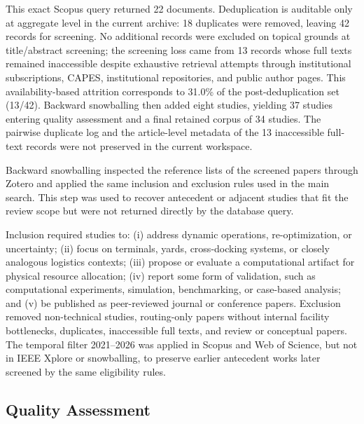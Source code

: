 \documentclass[preprint,12pt,number,longtitle]{elsarticle}
\begin{document}
This exact Scopus query returned 22 documents. Deduplication is auditable only at aggregate level in the current archive: 18 duplicates were removed, leaving 42 records for screening. No additional records were excluded on topical grounds at title/abstract screening; the screening loss came from 13 records whose full texts remained inaccessible despite exhaustive retrieval attempts through institutional subscriptions, CAPES, institutional repositories, and public author pages. This availability-based attrition corresponds to 31.0\% of the post-deduplication set (13/42). Backward snowballing then added eight studies, yielding 37 studies entering quality assessment and a final retained corpus of 34 studies. The pairwise duplicate log and the article-level metadata of the 13 inaccessible full-text records were not preserved in the current workspace.

Backward snowballing inspected the reference lists of the screened papers through Zotero and applied the same inclusion and exclusion rules used in the main search. This step was used to recover antecedent or adjacent studies that fit the review scope but were not returned directly by the database query.

Inclusion required studies to: (i) address dynamic operations, re-optimization, or uncertainty; (ii) focus on terminals, yards, cross-docking systems, or closely analogous logistics contexts; (iii) propose or evaluate a computational artifact for physical resource allocation; (iv) report some form of validation, such as computational experiments, simulation, benchmarking, or case-based analysis; and (v) be published as peer-reviewed journal or conference papers. Exclusion removed non-technical studies, routing-only papers without internal facility bottlenecks, duplicates, inaccessible full texts, and review or conceptual papers. The temporal filter 2021--2026 was applied in Scopus and Web of Science, but not in IEEE Xplore or snowballing, to preserve earlier antecedent works later screened by the same eligibility rules.

\subsection{Quality Assessment}
\end{document}
